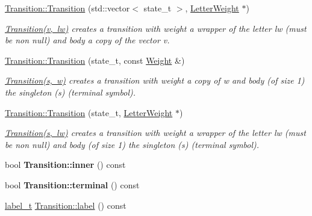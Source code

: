\begin{DoxyCompactItemize}
\mbox{\label{group__schemata_ga50836c0d84b3968b9ceb968521418e22}} 
\mbox{\hyperlink{group__schemata_ga50836c0d84b3968b9ceb968521418e22}{Transition\+::\+Transition}} (std\+::vector$<$ state\+\_\+t $>$, \mbox{\hyperlink{classLetterWeight}{Letter\+Weight}} $\ast$)
\begin{DoxyCompactList}\small\item\em \mbox{\hyperlink{classTransition}{Transition(v, lw)}} creates a transition with weight a wrapper of the letter lw (must be non null) and body a copy of the vector v. \end{DoxyCompactList}\item 
\mbox{\hyperlink{group__schemata_ga3c71fb93c73a755408cc963975d4ffa5}{Transition\+::\+Transition}} (state\+\_\+t, const \mbox{\hyperlink{classWeight}{Weight}} \&)
\begin{DoxyCompactList}\small\item\em \mbox{\hyperlink{classTransition}{Transition(s, w)}} creates a transition with weight a copy of w and body (of size 1) the singleton (s) (terminal symbol). \end{DoxyCompactList}\item 
\mbox{\label{group__schemata_ga458b953211e3b5de292c8c1535ff7281}} 
\mbox{\hyperlink{group__schemata_ga458b953211e3b5de292c8c1535ff7281}{Transition\+::\+Transition}} (state\+\_\+t, \mbox{\hyperlink{classLetterWeight}{Letter\+Weight}} $\ast$)
\begin{DoxyCompactList}\small\item\em \mbox{\hyperlink{classTransition}{Transition(s, lw)}} creates a transition with weight a wrapper of the letter lw (must be non null) and body (of size 1) the singleton (s) (terminal symbol). \end{DoxyCompactList}\item 
\mbox{\label{group__schemata_gaeb18d5879ecb7757b5e783866c3e6084}} 
bool {\bfseries Transition\+::inner} () const
\item 
\mbox{\label{group__schemata_ga1191490a05cc7d04a9933e5d84ca9fcd}} 
bool {\bfseries Transition\+::terminal} () const
\item 
\mbox{\hyperlink{group__output_ga22fde970e635fcf63962743b2d5c441d}{label\+\_\+t}} \mbox{\hyperlink{group__schemata_ga97dce48d13fac75a4a444a68aae07608}{Transition\+::label}} () const

\end{DoxyCompactItemize}
